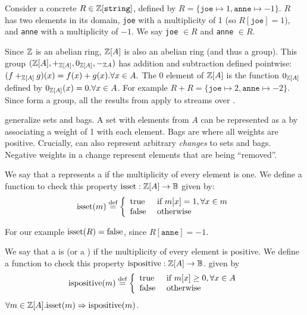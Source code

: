 \ifzsetexamples
Consider a concrete \zr $R \in \mathbb{Z}[\texttt{string}]$,
defined by $R = \{ \texttt{joe} \mapsto 1, \texttt{anne} \mapsto -1 \}$.
$R$ has two elements in its domain,
\texttt{joe} with a multiplicity of 1 (so $R[\texttt{joe}] = 1$),
and \texttt{anne} with a multiplicity of $-1$.
We say \texttt{joe} $\in R$ and \texttt{anne} $\in R$.
\fi

Since $\mathbb{Z}$ is an abelian ring, $\mathbb{Z}[A]$ is also an abelian ring (and thus a group).  This group
$(\mathbb{Z}[A], +_{\mathbb{Z}[A]}, 0_{\mathbb{Z}[A]}, -_{\mathbb{Z}{A}})$ has addition and subtraction defined pointwise:
$(f +_{\mathbb{Z}[A]} g)(x) = f(x) + g(x) . \forall x \in A.$
The $0$ element of $\mathbb{Z}[A]$ is the function $0_{\mathbb{Z}[A]}$ defined by $0_{\mathbb{Z}[A]}(x) = 0 .
\forall x \in A$.  For example $R + R =  \{ \texttt{joe} \mapsto 2, \texttt{anne} \mapsto -2 \}$.
Since \zrs form a group, all the results from  apply to streams over \zrs.

\zrs generalize sets and bags.  A set with elements from $A$
can be represented as a \zr by associating a weight of 1 with each element.
Bags are \zrs where all weights are positive.  Crucially, \zrs
can also represent arbitrary \emph{changes} to sets and bags.
Negative weights in a change represent elements that are being ``removed''.

\begin{definition}
We say that a \zr represents a  if the multiplicity of every
element is one.  We define a function to check this property
$\mbox{isset} : \mathbb{Z}[A] \rightarrow \mathbb{B}$
given by:
$$\mbox{isset}(m) \stackrel{\textrm{\scriptsize def}}{=} \left\{
\begin{array}{ll}
  \mbox{true} & \mbox{ if } m[x] = 1, \forall x \in m \\
  \mbox{false} & \mbox{ otherwise}
\end{array}
\right.
$$
\end{definition}

\ifzsetexamples
For our example $\mbox{isset}(R) = \mbox{false}$, since $R[\texttt{anne}] = -1$.
\fi

\begin{definition}
We say that a \zr is  (or a ) if the multiplicity of every element is
positive.  We define a function to check this property
$\mbox{ispositive} : \mathbb{Z}[A] \rightarrow \mathbb{B}$.
given by
$$\mbox{ispositive}(m) \stackrel{\textrm{\scriptsize def}}{=} \left\{
\begin{array}{ll}
  \mbox{true} & \mbox{ if } m[x] \geq 0, \forall x \in A \\
  \mbox{false} & \mbox{ otherwise}
\end{array}
\right.$$
$\forall m \in \mathbb{Z}[A] . \mbox{isset}(m) \Rightarrow \mbox{ispositive}(m)$.
\end{definition}

